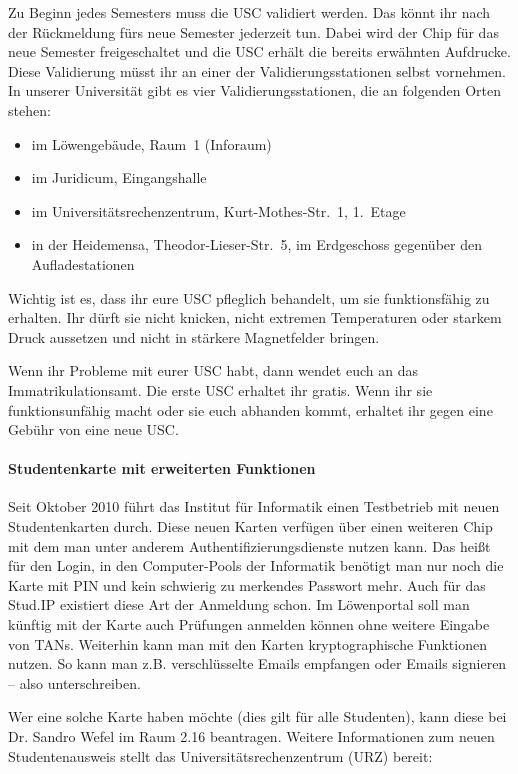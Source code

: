 Zu Beginn jedes Semesters muss die USC validiert werden. Das könnt ihr nach der Rückmeldung fürs neue Semester jederzeit tun.
Dabei wird der Chip für das neue Semester freigeschaltet und die USC erhält die bereits erwähnten Aufdrucke.
Diese Validierung müsst ihr an einer der Validierungsstationen selbst vornehmen.
In unserer Universität gibt es vier Validierungsstationen, die an folgenden Orten stehen:

\begin{itemize}
    \item im Löwengebäude, Raum~1 (Inforaum)
    \item im Juridicum, Eingangshalle
    \item im Universitätsrechenzentrum, Kurt-Mothes-Str.~1, 1.~Etage
    \item in der Heidemensa, Theodor-Lieser-Str.~5, im Erdgeschoss gegenüber den Aufladestationen
\end{itemize}

Wichtig ist es, dass ihr eure USC pfleglich behandelt, um sie funktionsfähig zu erhalten.
Ihr dürft sie nicht knicken, nicht extremen Temperaturen oder starkem Druck aussetzen und nicht in stärkere Magnetfelder bringen.

Wenn ihr Probleme mit eurer USC habt, dann wendet euch an das Immatrikulationsamt.
Die erste USC erhaltet ihr gratis.
Wenn ihr sie funktionsunfähig macht oder sie euch abhanden kommt, erhaltet ihr gegen eine Gebühr von  eine neue USC.

\paragraph{Studentenkarte mit erweiterten Funktionen}

Seit Oktober 2010 führt das Institut für Informatik einen Testbetrieb mit neuen Studentenkarten durch.
Diese neuen Karten verfügen über einen weiteren Chip mit dem man unter anderem Authentifizierungsdienste nutzen kann.
Das heißt für den Login, in den Computer-Pools der Informatik benötigt man nur noch die Karte mit PIN und kein schwierig zu merkendes Passwort mehr.
Auch für das Stud.IP existiert diese Art der Anmeldung schon.
Im Löwenportal soll man künftig mit der Karte auch Prüfungen anmelden können ohne weitere Eingabe von TANs.
Weiterhin kann man mit den Karten kryptographische Funktionen nutzen.
So kann man z.B. verschlüsselte Emails empfangen oder Emails signieren -- also unterschreiben.

Wer eine solche Karte haben möchte (dies gilt für alle Studenten), kann diese bei Dr. Sandro Wefel im Raum 2.16 beantragen.
Weitere Informationen zum neuen Studentenausweis stellt das Universitätsrechenzentrum (URZ) bereit:\\[1.0em]


